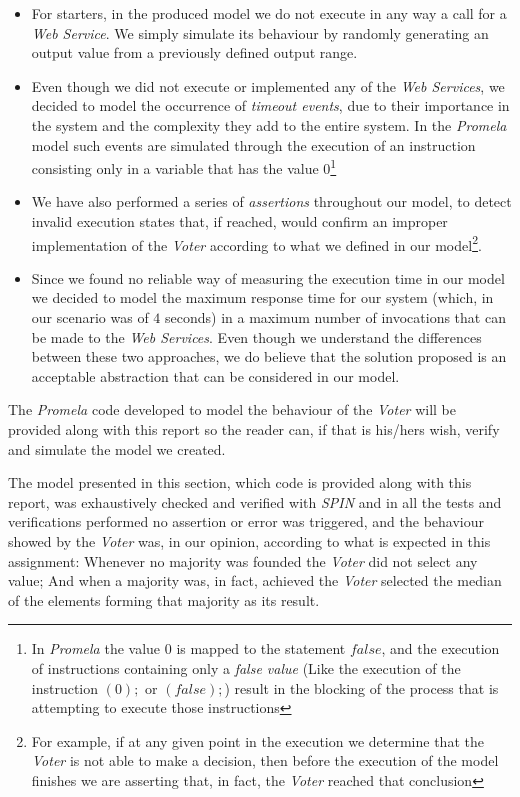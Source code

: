 \begin{itemize}
\item For starters, in the produced model we do not execute in any way a call for a \emph{Web Service}. We simply simulate its behaviour by randomly generating an output value from a previously defined output range.

\item Even though we did not execute or implemented any of the \emph{Web Services}, we decided to model the occurrence of \emph{timeout events}, due to their importance in the system and the complexity they add to the entire system. In the \emph{Promela} model such events are simulated through the execution of an instruction consisting only in a variable that has the value $0$\footnote{In \emph{Promela} the value $0$ is mapped to the statement $false$, and the execution of instructions containing only a \emph{false value} (Like the execution of the instruction $(0);$ or $(false);$) result in the blocking of the process that is attempting to execute those instructions}

\item We have also performed a series of \emph{assertions} throughout our model, to detect invalid execution states that, if reached, would confirm an improper implementation of the \emph{Voter} according to what we defined in our model\footnote{For example, if at any given point in the execution we determine that the \emph{Voter} is not able to make a decision, then before the execution of the model finishes we are asserting that, in fact, the \emph{Voter} reached that conclusion}.

\item Since we found no reliable way of measuring the execution time in our model we decided to model the maximum response time for our system (which, in our scenario was of $4$ seconds) in a maximum number of invocations that can be made to the \emph{Web Services}. Even though we understand the differences between these two approaches, we do believe that the solution proposed is an acceptable abstraction that can be considered in our model. 
\end{itemize}

The \emph{Promela} code developed to model the behaviour of the \emph{Voter} will be provided along with this report so the reader can, if that is his/hers wish, verify and simulate the model we created.

The model presented in this section, which code is provided along with this report, was exhaustively checked and verified with \emph{SPIN} and in all the tests and verifications performed no assertion or error was triggered, and the behaviour showed by the \emph{Voter} was, in our opinion, according to what is expected in this assignment: Whenever no majority was founded the \emph{Voter} did not select any value; And when a majority was, in fact, achieved the \emph{Voter} selected the median of the elements forming that majority as its result.